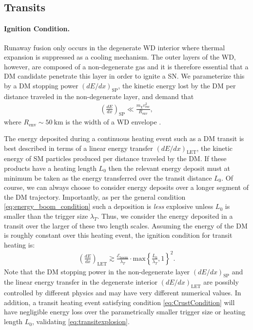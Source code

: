 \documentclass[preprintnumbers,amsmath,amssymb,prd,superscriptaddress]{revtex4}
\newcommand{\Eboom}{\mathcal{E}_\text{boom}}
\begin{document}

\subsection{Transits}

\paragraph{Ignition Condition.}
Runaway fusion only occurs in the degenerate WD interior where thermal expansion is suppressed as a cooling mechanism.
The outer layers of the WD, however, are composed of a non-degenerate gas and it is therefore essential that a DM candidate penetrate this layer in order to ignite a SN.
We parameterize this by a DM stopping power $(dE/dx)_\text{SP}$, the kinetic energy lost by the DM per distance traveled in the non-degenerate layer, and demand that
\begin{align}
\label{eq:CrustCondition}
  \left( \frac{d E}{d x} \right)_\text{SP} \ll
  \frac{m_\chi v^2_\text{esc}}{R_\text{env}},
\end{align}
where $R_\text{env} \sim 50 ~\text{km}$ is the width of a WD envelope \cite{KippenhahnWeigert}.

The energy deposited during a continuous heating event such as a DM transit is best described in terms of a linear energy transfer $(dE/dx)_\text{LET}$, the kinetic energy of SM particles produced per distance traveled by the DM.
If these products have a heating length $L_0$ then the relevant energy deposit must at minimum be taken as the energy transferred over the transit distance $L_0$.
Of course, we can always choose to consider energy deposits over a longer segment of the DM trajectory.
Importantly, as per the general condition \eqref{eq:energy_boom_condition} such a deposition is \emph{less} explosive unless $L_0$ is smaller than the trigger size $\lambda_T$.
Thus, we consider the energy deposited in a transit over the larger of these two length scales.
Assuming the energy of the DM is roughly constant over this heating event, the ignition condition for transit heating is:
\begin{align}
\label{eq:transitexplosion}
  \left( \frac{d E}{d x} \right)_\text{LET} \gtrsim
  \frac{\Eboom}{\lambda_T} \cdot \text{max}
  \left\{\frac{L_0}{\lambda_T}, 1 \right\}^2.
\end{align}
Note that the DM stopping power in the non-degenerate layer $(dE/dx)_\text{SP}$ and the linear energy transfer in the degenerate interior $(dE/dx)_\text{LET}$ are possibly controlled by different physics and may have very different numerical values.
In addition, a transit heating event satisfying condition \eqref{eq:CrustCondition} will have negligible energy loss over the parametrically smaller trigger size or heating length $L_0$, validating \eqref{eq:transitexplosion}.
\end{document}
